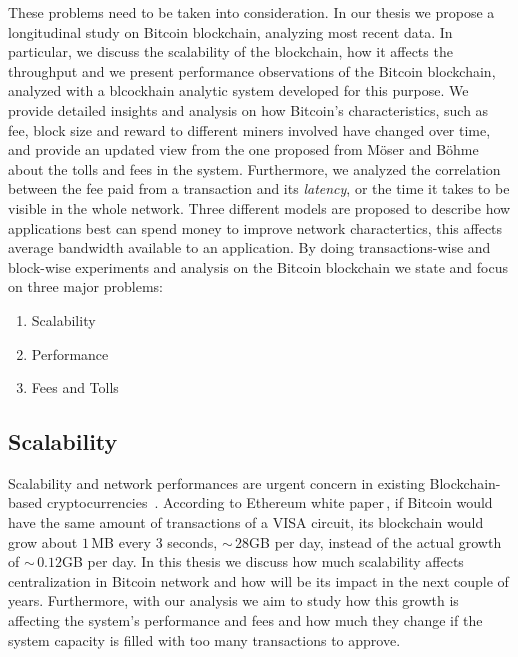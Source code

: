 \documentclass[USenglish]{uit-thesis}
\begin{document}
These problems need to be taken
into consideration.
In our thesis we propose a longitudinal study on Bitcoin blockchain,
analyzing most recent data.
In particular, we discuss the scalability of the blockchain, how it affects
the throughput and we present performance observations of the
Bitcoin blockchain, analyzed with a blcockhain analytic system developed
for this purpose. We provide detailed insights and analysis on how
Bitcoin's characteristics, such as fee, block size and reward to different
miners involved have changed over time, and provide an
updated view from the one proposed
from Möser and Böhme\,\cite{Moser2015} about
the tolls and fees in the system.
Furthermore, we analyzed the
correlation between the fee paid from a transaction
and its \emph{latency}, or the time it takes to 
be visible in the whole network.
Three different models are proposed to describe how applications
best can spend money to improve network charactertics,
this affects average bandwidth available to an application.
By doing transactions-wise and block-wise experiments
and analysis on the Bitcoin blockchain
we state and focus on three major problems:
\begin{enumerate}[noitemsep]
	\item Scalability
	\item Performance
	\item Fees and Tolls
\end{enumerate}

\subsection{Scalability}
\label{sec:prob_stat_scalability}
Scalability and network performances are urgent
concern in existing Blockchain-based
cryptocurrencies~\cite{croman2016}.
According to Ethereum white paper\,\cite{ethereum_white_paper},
if Bitcoin would have the same amount of transactions
of a VISA circuit, its blockchain would grow
about $1$\,MB every $3$ seconds, $\sim$\,$28$GB per day,
instead of the actual growth of $\sim$\,$0.12$GB per day.
In this thesis we discuss how much scalability affects
centralization in Bitcoin network and how will be its
impact in the next couple of years.
Furthermore, with our analysis we aim to study
how this growth is affecting the system's
performance and fees and how much they
change if the system capacity is filled with
too many transactions to approve.
\end{document}
